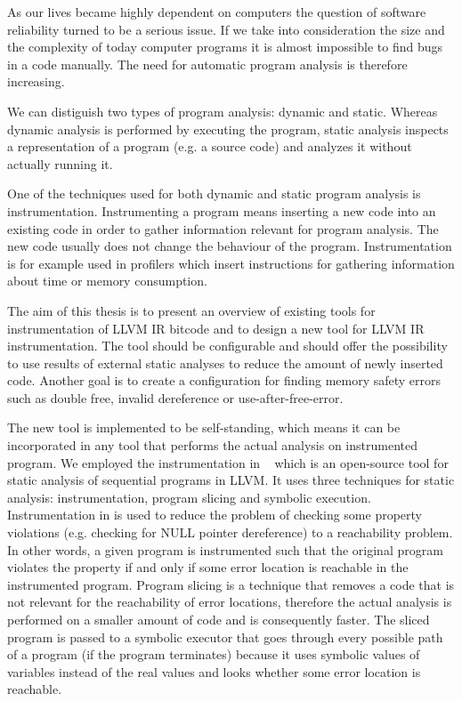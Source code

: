 As our lives became highly dependent on computers the question of software
reliability turned to be a serious issue. If we take into consideration the
size and the complexity of today computer programs it is almost impossible to
find bugs in a code manually. The need for automatic program analysis is
therefore increasing.

We can distiguish two types of program analysis: dynamic and static. Whereas
dynamic analysis is performed by executing the program, static analysis
inspects a representation of a program (e.g. a source code) and analyzes it
without actually running it.

One of the techniques used for both dynamic and static program analysis is
instrumentation. Instrumenting a program means inserting a new code into an
existing code in order to gather information relevant for program analysis. The
new code usually does not change the behaviour of the program. Instrumentation
is for example used in profilers which insert instructions for gathering
information about time or memory consumption. 

The aim of this thesis is to present an overview of existing tools for
instrumentation of LLVM IR bitcode and to design a new tool for LLVM IR
instrumentation. The tool should be configurable and should offer the
possibility to use results of external static analyses to reduce the amount of
newly inserted code. Another goal is to create a configuration for finding
memory safety errors such as double free, invalid dereference or
use-after-free-error.

The new tool is implemented to be self-standing, which means it can be
incorporated in any tool that performs the actual analysis on instrumented
program. We employed the instrumentation in \symbiotic~\cite{Symbiotic} which
is an open-source tool for static analysis of sequential programs in LLVM. It
uses three techniques for static analysis: instrumentation, program slicing and
symbolic execution. Instrumentation in \symbiotic is used to reduce the problem
of checking some property violations (e.g. checking for NULL pointer
dereference) to a reachability problem. In other words, a given program is
instrumented such that the original program violates the property if and only
if some error location is reachable in the instrumented program. Program
    slicing is a technique that removes a code that is not relevant for the
    reachability of error locations, therefore the actual analysis is performed
    on a smaller amount of code and is consequently faster. The sliced program
    is passed to a symbolic executor that goes through every possible path of a
    program (if the program terminates) because it uses symbolic values of
    variables instead of the real values and looks whether some error location
    is reachable.


